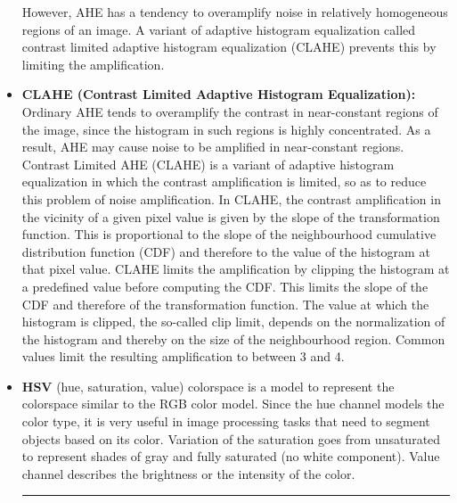 \documentclass{article}
\begin{document}
\begin{itemize}
    However, AHE has a tendency to overamplify noise in relatively homogeneous regions of an image. A variant of adaptive histogram equalization called contrast limited adaptive histogram equalization (CLAHE) prevents this by limiting the amplification. 
    \item \textbf{CLAHE (Contrast Limited Adaptive Histogram Equalization):} Ordinary AHE tends to overamplify the contrast in near-constant regions of the image, since the histogram in such regions is highly concentrated. As a result, AHE may cause noise to be amplified in near-constant regions. Contrast Limited AHE (CLAHE) is a variant of adaptive histogram equalization in which the contrast amplification is limited, so as to reduce this problem of noise amplification. In CLAHE, the contrast amplification in the vicinity of a given pixel value is given by the slope of the transformation function. This is proportional to the slope of the neighbourhood cumulative distribution function (CDF) and therefore to the value of the histogram at that pixel value. CLAHE limits the amplification by clipping the histogram at a predefined value before computing the CDF. This limits the slope of the CDF and therefore of the transformation function. The value at which the histogram is clipped, the so-called clip limit, depends on the normalization of the histogram and thereby on the size of the neighbourhood region. Common values limit the resulting amplification to between 3 and 4. 
    \item \textbf{HSV} (hue, saturation, value) colorspace is a model to represent the colorspace similar to the RGB color model. Since the hue channel models the color type, it is very useful in image processing tasks that need to segment objects based on its color. Variation of the saturation goes from unsaturated to represent shades of gray and fully saturated (no white component). Value channel describes the brightness or the intensity of the color.
    
    \par\noindent\rule{\textwidth}{0.5pt}
    \par
    

\end{itemize}
\end{document}

